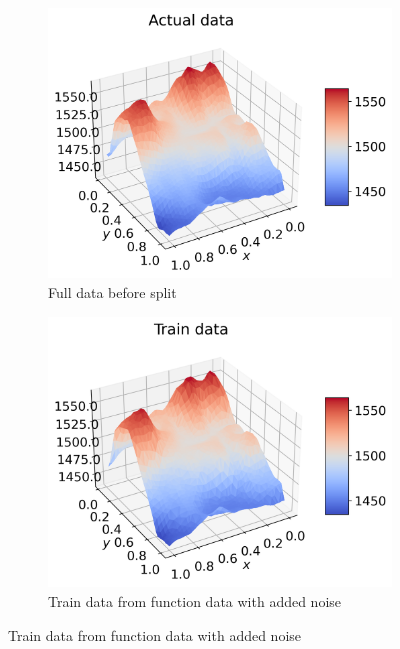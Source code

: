 \documentclass[12pt]{article}
\begin{document}
\begin{figure}[H]
  \begin{subfigure}{.5\textwidth}
    \centering
    \includegraphics[width=\textwidth]{../figures/actual_data_n40.png}
    \caption{Full data before split}
    \label{fig:real_pred_real}
  \end{subfigure}
  \begin{subfigure}{.5\textwidth}
    \centering
    \includegraphics[width=\textwidth]{../figures/train_data_n40.png}
    \caption{Train data from function data with added noise}
    \label{fig:real_pred_train}
  \end{subfigure}

\end{figure}
\end{document}
